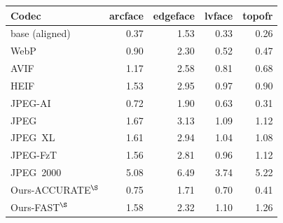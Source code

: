 \begin{tabular}{lrrrr}
    \toprule
    Codec & arcface & edgeface & lvface & topofr \\
    \midrule
    base (aligned)     & 0.37 & 1.53 & 0.33 & 0.26 \\
    WebP               & 0.90 & 2.30 & 0.52 & 0.47 \\
    AVIF               & 1.17 & 2.58 & 0.81 & 0.68 \\
    HEIF               & 1.53 & 2.95 & 0.97 & 0.90 \\
    JPEG-AI            & 0.72 & 1.90 & 0.63 & 0.31 \\
    JPEG               & 1.67 & 3.13 & 1.09 & 1.12 \\
    JPEG~XL            & 1.61 & 2.94 & 1.04 & 1.08 \\
    JPEG-FzT           & 1.56 & 2.81 & 0.96 & 1.12 \\
    JPEG~2000          & 5.08 & 6.49 & 3.74 & 5.22 \\
    Ours-ACCURATE$^{\S}$ & 0.75 & 1.71 & 0.70 & 0.41 \\
    Ours-FAST$^{\S}$     & 1.58 & 2.32 & 1.10 & 1.26 \\
    \bottomrule
  \end{tabular}
